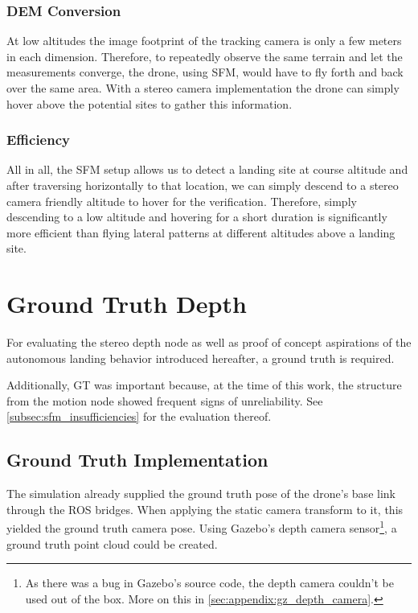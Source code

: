 \subsubsection{DEM Conversion}

At low altitudes the image footprint of the tracking camera is only a few meters in each dimension. Therefore, to repeatedly observe the same terrain and let the measurements converge, the drone, using SFM,  would have to fly forth and back over the same area. With a stereo camera implementation the drone can simply hover above the potential sites to gather this information.

\subsubsection{Efficiency}

All in all, the SFM setup allows us to detect a landing site at course altitude and after traversing horizontally to that location, we can simply descend to a stereo camera friendly altitude to hover for the verification. Therefore, simply descending to a low altitude and hovering for a short duration is significantly more efficient than flying lateral patterns at different altitudes above a landing site.

\section{Ground Truth Depth}

For evaluating the stereo depth node as well as proof of concept aspirations of the autonomous landing behavior introduced hereafter, a ground truth is required. 

Additionally, GT was important because, at the time of this work, the structure from the motion node showed frequent signs of unreliability. See \cref{subsec:sfm_insufficiencies} for the evaluation thereof.

\subsection{Ground Truth Implementation}
The simulation already supplied the ground truth pose of the drone's base link through the ROS bridges. When applying the static camera transform to it, this yielded the ground truth camera pose. Using Gazebo's depth camera sensor\footnote[3]{As there was a bug in Gazebo's source code, the depth camera couldn't be used out of the box. More on this in \cref{sec:appendix:gz_depth_camera}.}, a ground truth point cloud could be created.


